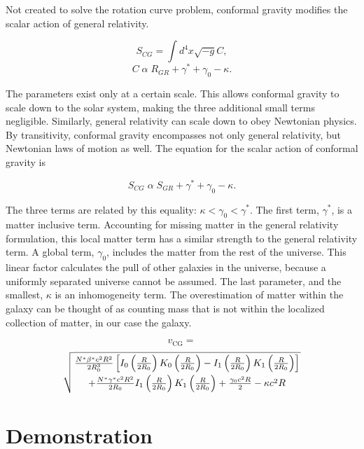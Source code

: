 \documentclass[titlepage]{article}
\begin{document}
Not created to solve the rotation curve problem, conformal gravity modifies the scalar action of general relativity.

\begin{equation}
S_{CG} = \int d^4x \sqrt{-g} C,
\end{equation} 
\begin{equation}
C \; \alpha \; R_{GR} + \gamma^* + \gamma_0 - \kappa.
\end{equation}

The parameters exist only at a certain scale. This allows conformal gravity to scale down to the solar system, making the three additional small terms negligible. Similarly, general relativity can scale down to obey Newtonian physics. By transitivity, conformal gravity encompasses not only general relativity, but Newtonian laws of motion as well. The equation for the scalar action of conformal gravity is

\begin{equation}
S_{CG} \; \alpha \; S_{GR} + \gamma^* + \gamma_0 - \kappa.
\end{equation}

The three terms are related by this equality: $\kappa < \gamma_0 < \gamma^*$. The first term, $\gamma^*$, is a matter inclusive term. Accounting for missing matter in the general relativity formulation, this local matter term has a similar strength to the general relativity term. A global term, $\gamma_0$, includes the matter from the rest of the universe. This linear factor calculates the pull of other galaxies in the universe, because a uniformly separated universe cannot be assumed. The last parameter, and the smallest, $\kappa$ is an inhomogeneity term. The overestimation of matter within the galaxy can be thought of as counting mass that is not within the localized collection of matter, in our case the galaxy.



\begin{equation}
v_{\text{CG}} =
\end{equation}
\begin{equation*}
\sqrt{\genfrac{}{}{0pt}{}{\frac{N^*\beta^*c^2R^2}{2R^3_0}\left[I_0\left(\frac{R}{2R_0}\right)K_0\left(\frac{R}{2R_0}\right)-I_1\left(\frac{R}{2R_0}\right)K_1\left(\frac{R}{2R_0}\right)\right]}{+\frac{N^*\gamma^*c^2R^2}{2R_0}I_1\left(\frac{R}{2R_0}\right)K_1\left(\frac{R}{2R_0}\right)+\frac{\gamma_0c^2R}{2}-\kappa c^2R}}
\end{equation*}

\section{Demonstration}
\end{document}
